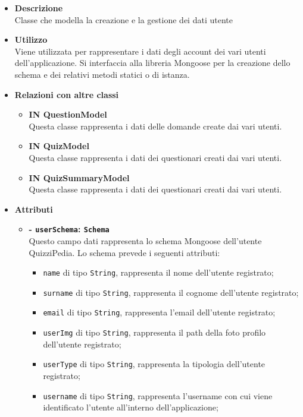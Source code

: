 \begin{itemize}
	\item \textbf{Descrizione} \\
	Classe che modella la creazione e la gestione dei dati utente
	\item \textbf{Utilizzo} \\
	Viene utilizzata per rappresentare i dati degli account dei vari utenti dell’applicazione. Si interfaccia alla libreria Mongoose per la creazione dello schema e dei relativi metodi statici o di istanza.
	\item \textbf{Relazioni con altre classi} 
		\begin{itemize}
			\item \textbf{IN QuestionModel} \\
			Questa classe rappresenta i dati delle domande create dai vari utenti.
			\item \textbf{IN QuizModel} \\
			Questa classe rappresenta i dati dei questionari creati dai vari utenti.
			\item \textbf{IN QuizSummaryModel} \\
			Questa classe rappresenta i dati dei questionari creati dai vari utenti.
		\end{itemize}
	\item \textbf{Attributi} 
		\begin{itemize}
			\item \textbf{- \texttt{userSchema}: \texttt{Schema}} \\
			Questo campo dati rappresenta lo schema Mongoose dell'utente QuizziPedia. Lo schema prevede i seguenti attributi:
			\begin{itemize}
				\item 
					\texttt{name} di tipo \texttt{String}, rappresenta il nome  dell'utente registrato;
				\item 
					\texttt{surname} di tipo \texttt{String}, rappresenta il cognome  dell'utente registrato;
				\item 
					\texttt{email} di tipo \texttt{String}, rappresenta l'email  dell'utente registrato;
				\item 
					\texttt{userImg} di tipo \texttt{String}, rappresenta il path della foto profilo dell'utente registrato;
				\item 
					\texttt{userType} di tipo \texttt{String}, rappresenta la tipologia dell'utente registrato;
				\item 
					\texttt{username} di tipo \texttt{String}, rappresenta l'username con cui viene identificato l'utente all'interno dell'applicazione;		

\end{itemize}
\end{itemize}
\end{itemize}

